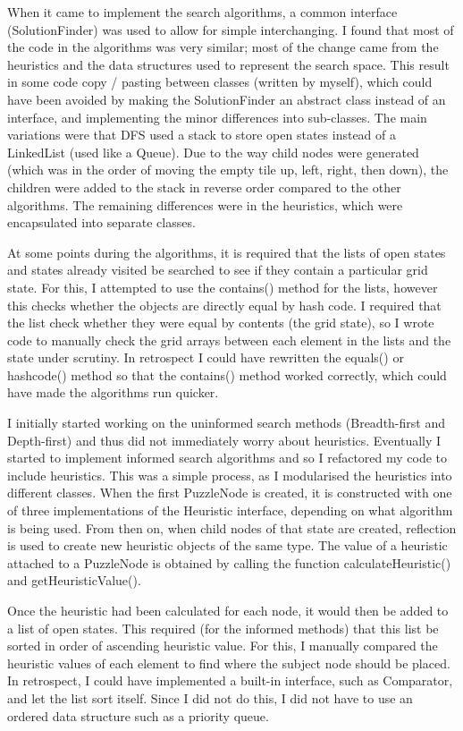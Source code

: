 \documentclass[12pt]{article}
\begin{document}
When it came to implement the search algorithms, a common interface (SolutionFinder) was used to allow for simple interchanging. I found that most of the code in the algorithms was very similar; most of the change came from the heuristics and the data structures used to represent the search space. This result in some code copy / pasting between classes (written by myself), which could have been avoided by making the SolutionFinder an abstract class instead of an interface, and implementing the minor differences into sub-classes. The main variations were that DFS used a stack to store open states instead of a LinkedList (used like a Queue). Due to the way child nodes were generated (which was in the order of moving the empty tile up, left, right, then down), the children were added to the stack in reverse order compared to the other algorithms. The remaining differences were in the heuristics, which were encapsulated into separate classes.

At some points during the algorithms, it is required that the lists of open states and states already visited be searched to see if they contain a particular grid state. For this, I attempted to use the contains() method for the lists, however this checks whether the objects are directly equal by hash code. I required that the list check whether they were equal by contents (the grid state), so I wrote code to manually check the grid arrays between each element in the lists and the state under scrutiny. In retrospect I could have rewritten the equals() or hashcode() method so that the contains() method worked correctly, which could have made the algorithms run quicker.

I initially started working on the uninformed search methods (Breadth-first and Depth-first) and thus did not immediately worry about heuristics. Eventually I started to implement informed search algorithms and so I refactored my code to include heuristics. This was a simple process, as I modularised the heuristics into different classes. When the first PuzzleNode is created, it is constructed with one of three implementations of the Heuristic interface, depending on what algorithm is being used. From then on, when child nodes of that state are created, reflection is used to create new heuristic objects of the same type. The value of a heuristic attached to a PuzzleNode is obtained by calling the function calculateHeuristic() and getHeuristicValue().

Once the heuristic had been calculated for each node, it would then be added to a list of open states. This required (for the informed methods) that this list be sorted in order of ascending heuristic value. For this, I manually compared the heuristic values of each element to find where the subject node should be placed. In retrospect, I could have implemented a built-in interface, such as Comparator, and let the list sort itself. Since I did not do this, I did not have to use an ordered data structure such as a priority queue.
\end{document}
